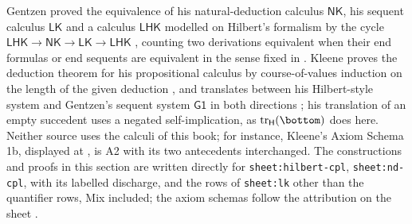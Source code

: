 Gentzen proved the equivalence of his natural-deduction calculus
\(\mathsf{NK}\), his sequent calculus \(\mathsf{LK}\) and a calculus
\(\mathsf{LHK}\) modelled on Hilbert's formalism by the cycle
\(\mathsf{LHK}\to\mathsf{NK}\to\mathsf{LK}\to\mathsf{LHK}\)
\cite[Abschnitt~V, \S 6, p.~429]{Gentzen1935b}, counting two derivations
equivalent when their end formulas or end sequents are equivalent in the
sense fixed in \cite[Abschnitt~V, \S 1, pp.~417--418]{Gentzen1935b}.
Kleene proves the deduction theorem for his propositional calculus by
course-of-values induction on the length of the given deduction
\cite[\S 21, Theorem~1, p.~90]{Kleene1952}, and translates between his
Hilbert-style system and Gentzen's sequent system \(\mathsf{G1}\) in both
directions \cite[\S 77, Theorems~46 and 47, pp.~445--446]{Kleene1952}; his
translation of an empty succedent uses a negated self-implication, as
\(\operatorname{tr}_{\mathsf H}(\bottom)\) does here.  Neither source uses
the calculi of this book; for instance, Kleene's Axiom Schema 1b, displayed
at \cite[\S 21, p.~92]{Kleene1952}, is A2 with its two antecedents
interchanged.  The constructions and proofs in this section are written
directly for \texttt{sheet:\allowbreak hilbert-cpl},
\texttt{sheet:\allowbreak nd-cpl}, with its labelled discharge, and the
rows of \texttt{sheet:\allowbreak lk} other than the quantifier rows, Mix
included; the axiom schemas follow the
attribution on the sheet \cite{Mendelson1997}.

